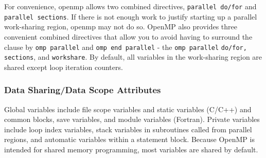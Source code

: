 \documentclass[10pt]{article}
\begin{document}
\begin{flushleft}
For convenience, \gls{openmp} allows two combined directives, {\tt parallel do/for} and {\tt parallel sections}. If there is not enough work to justify starting up a parallel work-sharing region, \gls{openmp} may not do so. OpenMP also provides three convenient combined directives that allow you to avoid having to surround the clause by {\tt omp parallel} and {\tt omp end parallel} - the {\tt omp parallel} {\tt do/for, sections}, and {\tt workshare}. By default, all variables in the work-sharing region are shared except loop iteration counters.

\subsubsection{Data Sharing/Data Scope Attributes}

Global variables include file scope variables and static variables (C/C++) and common blocks, save variables, and module variables (Fortran). Private variables include loop index variables, stack variables in subroutines called from parallel regions, and automatic variables within a statement block. Because OpenMP is intended for shared memory programming, most variables are shared by default. 


\end{flushleft}
\end{document}

